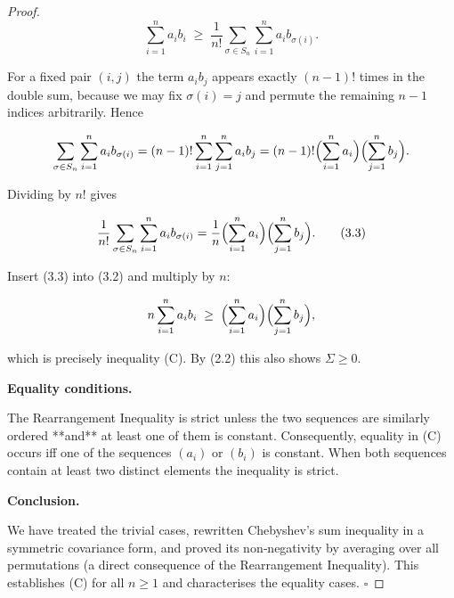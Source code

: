 \begin{proof}
\[
\sum_{i=1}^{n}a_{i}b_{i}
   \;\ge\;
   \frac1{n!}\sum_{\sigma\in S_{n}}\sum_{i=1}^{n}a_{i}b_{\sigma(i)}. \tag{3.2}
\]

For a fixed pair \((i,j)\) the term \(a_{i}b_{j}\) appears exactly \((n-1)!\)
times in the double sum, because we may fix \(\sigma(i)=j\) and permute the
remaining \(n-1\) indices arbitrarily.  Hence

\[
\sum_{\sigma\in S_{n}}\sum_{i=1}^{n}a_{i}b_{\sigma(i)}
   =(n-1)!\sum_{i=1}^{n}\sum_{j=1}^{n}a_{i}b_{j}
   =(n-1)!\Bigl(\sum_{i=1}^{n}a_{i}\Bigr)
            \Bigl(\sum_{j=1}^{n}b_{j}\Bigr).
\]

Dividing by \(n!\) gives  

\[
\frac1{n!}\sum_{\sigma\in S_{n}}\sum_{i=1}^{n}a_{i}b_{\sigma(i)}
   =\frac1{n}\Bigl(\sum_{i=1}^{n}a_{i}\Bigr)
               \Bigl(\sum_{j=1}^{n}b_{j}\Bigr). \tag{3.3}
\]

Insert (3.3) into (3.2) and multiply by \(n\):

\[
n\sum_{i=1}^{n}a_{i}b_{i}
   \;\ge\;
   \Bigl(\sum_{i=1}^{n}a_{i}\Bigr)
   \Bigl(\sum_{j=1}^{n}b_{j}\Bigr),
\]

which is precisely inequality (C).  By (2.2) this also shows \(\Sigma\ge0\).

\medskip\noindent\textbf{Equality conditions.}  

The Rearrangement Inequality is strict unless the two sequences are
similarly ordered **and** at least one of them is constant.  Consequently,
equality in (C) occurs iff one of the sequences \((a_{i})\) or \((b_{i})\) is
constant.  When both sequences contain at least two distinct elements the
inequality is strict.

\medskip\noindent\textbf{Conclusion.}  

We have treated the trivial cases, rewritten Chebyshev’s sum inequality in a
symmetric covariance form, and proved its non‑negativity by averaging over all
permutations (a direct consequence of the Rearrangement Inequality).  This
establishes (C) for all \(n\ge 1\) and characterises the equality cases. \(\square\)
\end{proof}